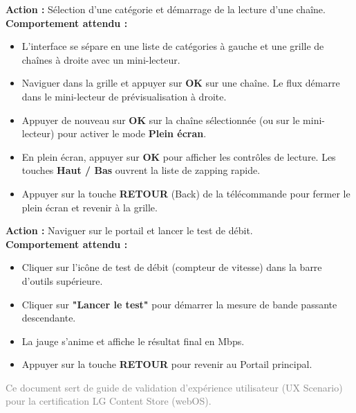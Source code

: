 \documentclass[11pt,a4paper]{article}
\newenvironment{scenario}[2]{%
  \begin{tcolorbox}[
    colback=light,
    colframe=primary,
    coltitle=white,
    title={\textbf{#1} : #2},
    fonttitle=\large\bfseries,
    arc=4px,
    boxrule=1.5pt,
    top=10pt,
    bottom=10pt,
    left=10pt,
    right=10pt
  ]
}{%
  \end{tcolorbox}
  \vspace{10pt}
}
\begin{document}
\begin{scenario}{Scénario 4}{Lecture en direct \& Plein écran}
\textbf{Action :} Sélection d'une catégorie et démarrage de la lecture d'une chaîne.\\
\textbf{Comportement attendu :}
\begin{itemize}[leftmargin=15pt, label=\textbullet]
    \item L'interface se sépare en une liste de catégories à gauche et une grille de chaînes à droite avec un mini-lecteur.
    \item Naviguer dans la grille et appuyer sur \textbf{OK} sur une chaîne. Le flux démarre dans le mini-lecteur de prévisualisation à droite.
    \item Appuyer de nouveau sur \textbf{OK} sur la chaîne sélectionnée (ou sur le mini-lecteur) pour activer le mode \textbf{Plein écran}.
    \item En plein écran, appuyer sur \textbf{OK} pour afficher les contrôles de lecture. Les touches \textbf{Haut / Bas} ouvrent la liste de zapping rapide.
    \item Appuyer sur la touche \textbf{RETOUR} (Back) de la télécommande pour fermer le plein écran et revenir à la grille.
\end{itemize}
\end{scenario}

\begin{scenario}{Scénario 5}{Test de débit réseau (Speed Test)}
\textbf{Action :} Naviguer sur le portail et lancer le test de débit.\\
\textbf{Comportement attendu :}
\begin{itemize}[leftmargin=15pt, label=\textbullet]
    \item Cliquer sur l'icône de test de débit (compteur de vitesse) dans la barre d'outils supérieure.
    \item Cliquer sur \textbf{"Lancer le test"} pour démarrer la mesure de bande passante descendante.
    \item La jauge s'anime et affiche le résultat final en Mbps.
    \item Appuyer sur la touche \textbf{RETOUR} pour revenir au Portail principal.
\end{itemize}
\end{scenario}

\vfill
\begin{center}
    \small\textcolor{gray}{Ce document sert de guide de validation d'expérience utilisateur (UX Scenario) pour la certification LG Content Store (webOS).}
\end{center}
\end{document}
